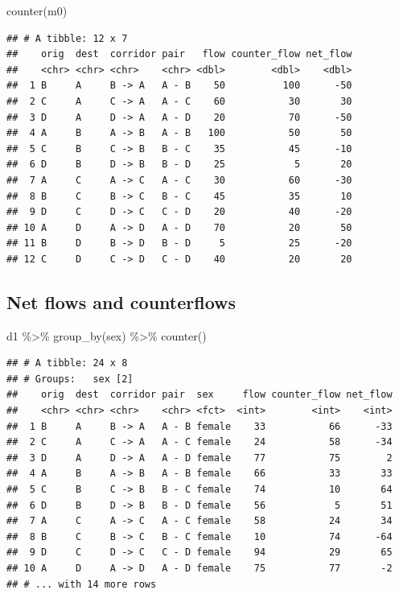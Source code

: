 \documentclass[
]{book}
\newenvironment{Shaded}{\begin{snugshade}}{\end{snugshade}}
\newcommand{\FunctionTok}[1]{\textcolor[rgb]{0.00,0.00,0.00}{#1}}
\newcommand{\NormalTok}[1]{#1}
\newcommand{\SpecialCharTok}[1]{\textcolor[rgb]{0.00,0.00,0.00}{#1}}
\begin{document}
\begin{Shaded}
\begin{Highlighting}[]
\FunctionTok{counter}\NormalTok{(m0)}
\end{Highlighting}
\end{Shaded}

\begin{verbatim}
## # A tibble: 12 x 7
##    orig  dest  corridor pair   flow counter_flow net_flow
##    <chr> <chr> <chr>    <chr> <dbl>        <dbl>    <dbl>
##  1 B     A     B -> A   A - B    50          100      -50
##  2 C     A     C -> A   A - C    60           30       30
##  3 D     A     D -> A   A - D    20           70      -50
##  4 A     B     A -> B   A - B   100           50       50
##  5 C     B     C -> B   B - C    35           45      -10
##  6 D     B     D -> B   B - D    25            5       20
##  7 A     C     A -> C   A - C    30           60      -30
##  8 B     C     B -> C   B - C    45           35       10
##  9 D     C     D -> C   C - D    20           40      -20
## 10 A     D     A -> D   A - D    70           20       50
## 11 B     D     B -> D   B - D     5           25      -20
## 12 C     D     C -> D   C - D    40           20       20
\end{verbatim}

\hypertarget{net-flows-and-counterflows-1}{%
\subsection{Net flows and counterflows}\label{net-flows-and-counterflows-1}}

\begin{Shaded}
\begin{Highlighting}[]
\NormalTok{d1 }\SpecialCharTok{\%\textgreater{}\%}
  \FunctionTok{group\_by}\NormalTok{(sex) }\SpecialCharTok{\%\textgreater{}\%}
  \FunctionTok{counter}\NormalTok{()}
\end{Highlighting}
\end{Shaded}

\begin{verbatim}
## # A tibble: 24 x 8
## # Groups:   sex [2]
##    orig  dest  corridor pair  sex     flow counter_flow net_flow
##    <chr> <chr> <chr>    <chr> <fct>  <int>        <int>    <int>
##  1 B     A     B -> A   A - B female    33           66      -33
##  2 C     A     C -> A   A - C female    24           58      -34
##  3 D     A     D -> A   A - D female    77           75        2
##  4 A     B     A -> B   A - B female    66           33       33
##  5 C     B     C -> B   B - C female    74           10       64
##  6 D     B     D -> B   B - D female    56            5       51
##  7 A     C     A -> C   A - C female    58           24       34
##  8 B     C     B -> C   B - C female    10           74      -64
##  9 D     C     D -> C   C - D female    94           29       65
## 10 A     D     A -> D   A - D female    75           77       -2
## # ... with 14 more rows
\end{verbatim}
\end{document}
